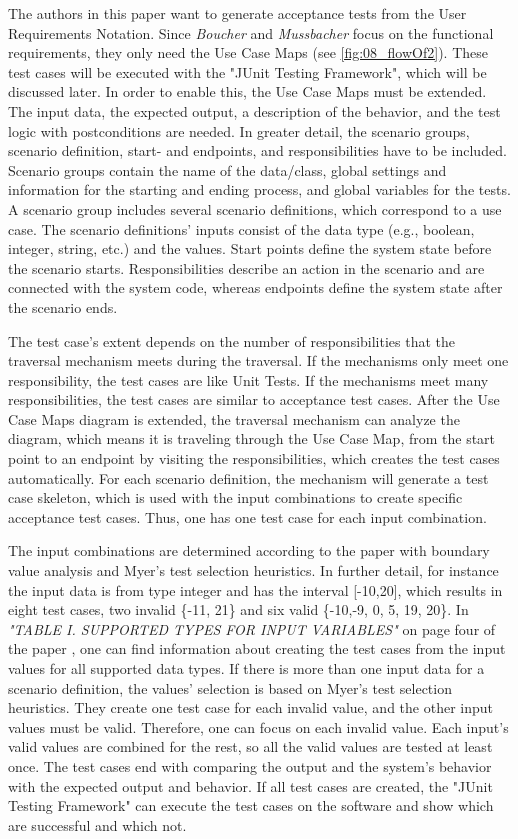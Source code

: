 The authors in this paper want to generate acceptance tests from the User Requirements Notation. Since \textit{Boucher} and \textit{Mussbacher} focus on the functional requirements, they only need the Use Case Maps (see \autoref{fig:08_flowOf2}). These test cases will be executed with the "JUnit Testing Framework", which will be discussed later. In order to enable this, the Use Case Maps must be extended. The input data, the expected output, a description of the behavior, and the test logic with postconditions are needed. In greater detail, the scenario groups, scenario definition, start- and endpoints, and responsibilities have to be included. Scenario groups contain the name of the data/class, global settings and information for the starting and ending process, and global variables for the tests. A scenario group includes several scenario definitions, which correspond to a use case. The scenario definitions' inputs consist of the data type (e.g., boolean, integer, string, etc.) and the values. Start points define the system state before the scenario starts. Responsibilities describe an action in the scenario and are connected with the system code, whereas endpoints define the system state after the scenario ends. 

The test case's extent depends on the number of responsibilities that the traversal mechanism meets during the traversal. If the mechanisms only meet one responsibility, the test cases are like Unit Tests. If the mechanisms meet many responsibilities, the test cases are similar to acceptance test cases. After the Use Case Maps diagram is extended, the traversal mechanism can analyze the diagram, which means it is traveling through the Use Case Map, from the start point to an endpoint by visiting the responsibilities, which creates the test cases automatically. For each scenario definition, the mechanism will generate a test case skeleton, which is used with the input combinations to create specific acceptance test cases. Thus, one has one test case for each input combination. 

The input combinations are determined according to the paper with boundary value analysis and Myer's test selection heuristics. In further detail, for instance the input data is from type integer and has the interval [-10,20], which results in eight test cases, two invalid \{-11, 21\} and six valid \{-10,-9, 0, 5, 19, 20\}. In \textit{"TABLE I. SUPPORTED TYPES FOR INPUT VARIABLES"} on page four of the paper \cite{BoucherMussbacher2017}, one can find information about creating the test cases from the input values for all supported data types. If there is more than one input data for a scenario definition, the values' selection is based on Myer's test selection heuristics. They create one test case for each invalid value, and the other input values must be valid. Therefore, one can focus on each invalid value. Each input's valid values are combined for the rest, so all the valid values are tested at least once. The test cases end with comparing the output and the system's behavior with the expected output and behavior. If all test cases are created, the "JUnit Testing Framework" can execute the test cases on the software and show which are successful and which not.

